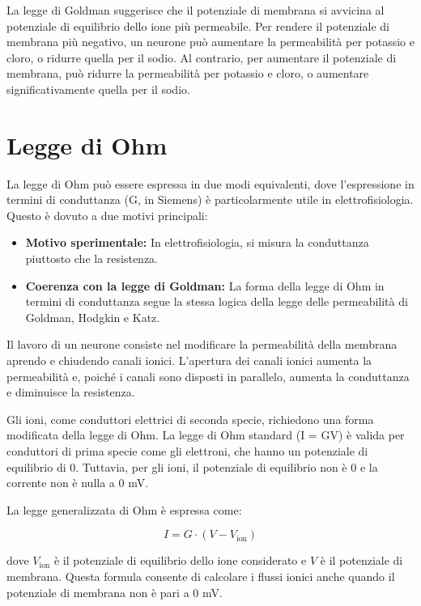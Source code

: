 La legge di Goldman suggerisce che il potenziale di membrana si avvicina al potenziale di equilibrio dello ione più permeabile. Per rendere il potenziale di membrana più negativo, un neurone può aumentare la permeabilità per potassio e cloro, o ridurre quella per il sodio. Al contrario, per aumentare il potenziale di membrana, può ridurre la permeabilità per potassio e cloro, o aumentare significativamente quella per il sodio.


\section{Legge di Ohm}
La legge di Ohm può essere espressa in due modi equivalenti, dove l'espressione in termini di conduttanza (G, in Siemens) è particolarmente utile in elettrofisiologia. Questo è dovuto a due motivi principali:

\begin{itemize}
    \item \textbf{Motivo sperimentale:} In elettrofisiologia, si misura la conduttanza piuttosto che la resistenza.
    \item \textbf{Coerenza con la legge di Goldman:} La forma della legge di Ohm in termini di conduttanza segue la stessa logica della legge delle permeabilità di Goldman, Hodgkin e Katz.
\end{itemize}

Il lavoro di un neurone consiste nel modificare la permeabilità della membrana aprendo e chiudendo canali ionici. L'apertura dei canali ionici aumenta la permeabilità e, poiché i canali sono disposti in parallelo, aumenta la conduttanza e diminuisce la resistenza.

Gli ioni, come conduttori elettrici di seconda specie, richiedono una forma modificata della legge di Ohm. La legge di Ohm standard (I = GV) è valida per conduttori di prima specie come gli elettroni, che hanno un potenziale di equilibrio di 0. Tuttavia, per gli ioni, il potenziale di equilibrio non è 0 e la corrente non è nulla a 0 mV. 

La legge generalizzata di Ohm è espressa come:

\[
I = G \cdot (V - V_{\text{ion}})
\]

dove \(V_{\text{ion}}\) è il potenziale di equilibrio dello ione considerato e \(V\) è il potenziale di membrana. Questa formula consente di calcolare i flussi ionici anche quando il potenziale di membrana non è pari a 0 mV.

